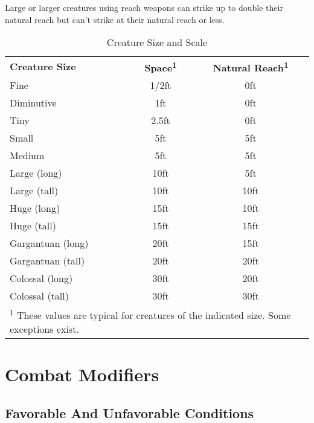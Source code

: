 Large or larger creatures using reach weapons can strike up to double their natural 
reach but can't strike at their natural reach or less. 

\begin{table}[htb]
\caption{Creature Size and Scale}
\centering
\begin{tabular}{lcc}
\textbf{Creature Size} & \textbf{Space\textsuperscript{1}} & \textbf{Natural Reach\textsuperscript{1}}\\
Fine & 1/2ft & 0ft\\
Diminutive & 1ft & 0ft\\
Tiny & 2.5ft & 0ft\\
Small & 5ft & 5ft\\
Medium & 5ft & 5ft\\
Large (long) & 10ft & 5ft\\
Large (tall) & 10ft & 10ft\\
Huge (long) & 15ft & 10ft\\
Huge (tall) & 15ft & 15ft\\
Gargantuan (long) & 20ft & 15ft\\
Gargantuan (tall) & 20ft & 20ft\\
Colossal (long) & 30ft & 20ft\\
Colossal (tall) & 30ft & 30ft\\
\multicolumn{3}{p{6cm}}{\textsuperscript{1} These values are typical for creatures of the indicated size. Some exceptions exist.}\\
\end{tabular}
\end{table}

\section{Combat Modifiers}

\subsection{Favorable And Unfavorable Conditions}

